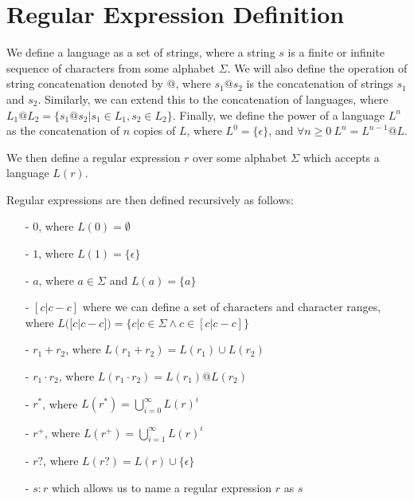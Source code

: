 \section{Regular Expression Definition}\label{sec:regular-expression-definition}

We define a language as a set of strings, where a string $s$ is a finite or infinite sequence of characters from some alphabet $\Sigma$.
We will also define the operation of string concatenation denoted by $@$, where $s_1 @ s_2$ is the concatenation of strings $s_1$ and $s_2$.
Similarly, we can extend this to the concatenation of languages, where $L_1 @ L_2 = \{s_1 @ s_2 | s_1 \in L_1, s_2 \in L_2\}$.
Finally, we define the power of a language $L^n$ as the concatenation of $n$ copies of $L$, where $L^0 = \{\epsilon\}$, and $\forall n \geq 0 \ L^n = L^{n-1} @ L$.

We then define a regular expression $r$ over some alphabet $\Sigma$ which accepts a language $L(r)$.

Regular expressions are then defined recursively as follows:
\begin{enumerate}
    \item[-] $0$, where $L(0) = \emptyset$
    \item[-] $1$, where $L(1) = \{\epsilon\}$
    \item[-] $a$, where $a \in \Sigma$ and $L(a) = \{a\}$
    \item[-] $[c|c-c]$ where we can define a set of characters and character ranges, where $L([c|c-c]) = \{c | c \in \Sigma \land c \in [c|c-c]\}$
    \item[-] $r_1 + r_2$, where $L(r_1 + r_2) = L(r_1) \cup L(r_2)$
    \item[-] $r_1 \cdot r_2$, where $L(r_1 \cdot r_2) = L(r_1) @ L(r_2)$
    \item[-] $r^*$, where $L(r^*) = \bigcup_{i=0}^{\infty} L(r)^i$
    \item[-] $r^+$, where $L(r^+) = \bigcup_{i=1}^{\infty} L(r)^i$
    \item[-] $r?$, where $L(r?) = L(r) \cup \{\epsilon\}$
    \item[-] $s:r$ which allows us to name a regular expression $r$ as $s$
\end{enumerate}
